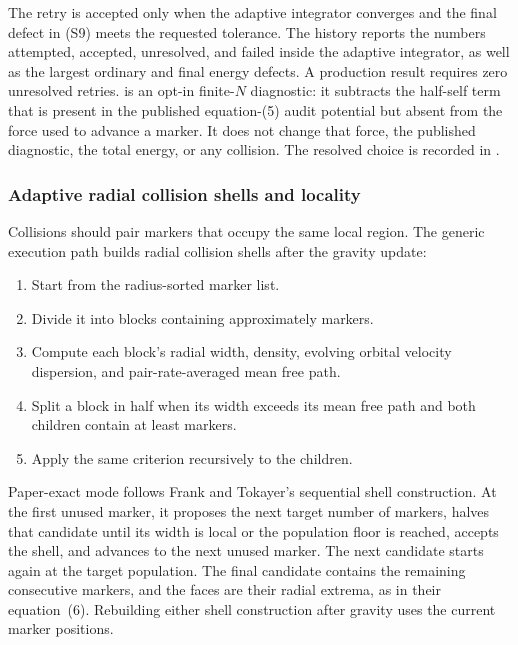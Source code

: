 The retry is accepted only when the adaptive integrator converges and the
final defect in (S9) meets the requested tolerance.  The history reports the
numbers attempted, accepted,
unresolved, and failed inside the adaptive integrator, as well as the largest
ordinary and final energy defects.  A production result requires zero
unresolved retries.
 is an opt-in
finite-\(N\) diagnostic: it subtracts the half-self term that is present in
the published equation-(5) audit potential but absent from the force used to
advance a marker.  It does not change that force, the published diagnostic,
the total energy, or any collision.  The resolved choice is recorded in
.

\subsubsection{Adaptive radial collision shells and locality}

Collisions should pair markers that occupy the same local region.  The
generic execution path builds radial collision shells after the gravity update:
\begin{enumerate}
\item Start from the radius-sorted marker list.
\item Divide it into blocks containing approximately
       markers.
\item Compute each block's radial width, density, evolving orbital velocity
      dispersion, and pair-rate-averaged mean free path.
\item Split a block in half when its width exceeds its mean free path and both
      children contain at least  markers.
\item Apply the same criterion recursively to the children.
\end{enumerate}

Paper-exact mode follows Frank and Tokayer's sequential shell construction.
At the first unused marker, it proposes the next target number of markers,
halves that candidate until its width is local or the population floor is
reached, accepts the shell, and advances to the next unused marker.  The next
candidate starts again at the target population.  The final candidate contains
the remaining consecutive markers, and the faces are their radial extrema,
as in their equation~(6).  Rebuilding either shell construction after gravity
uses the current marker positions.

